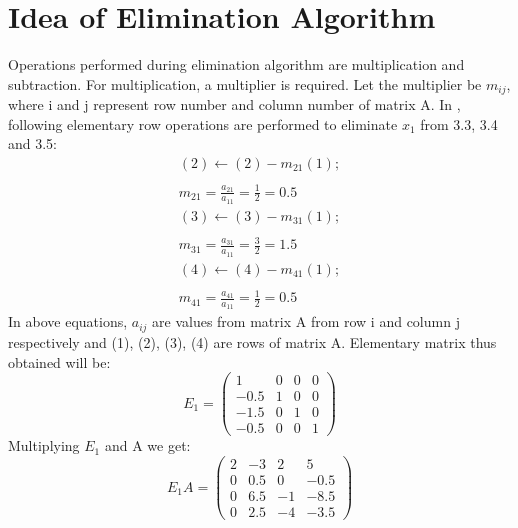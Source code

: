 \documentclass[12pt, oneside,table]{report}
\newcommand{\?}{\stackrel{?}{=}}
\theoremstyle{definition}
\begin{document}
\section{Idea of Elimination Algorithm}
Operations performed during elimination algorithm are multiplication and subtraction. For multiplication, a multiplier is required. Let the multiplier be $m_{ij}$, where i and j represent row number and column number of matrix A. In , following elementary row operations are performed to eliminate $x_{1}$ from 3.3, 3.4 and 3.5:
\begin{equation}
\begin{matrix}
    \left(2\right) \longleftarrow \left(2\right) - m_{21}\left(1\right);\\
    \\
    m_{21} = \frac{a_{21}}{a_{11}}=\frac{1}{2}=0.5
    \end{matrix}
\end{equation}
\begin{equation}
\begin{matrix}
    \left(3\right) \longleftarrow \left(3\right) - m_{31}\left(1\right);\\
    \\
    m_{31} = \frac{a_{31}}{a_{11}}=\frac{3}{2}=1.5
    \end{matrix}
\end{equation}
\begin{equation}
\begin{matrix}
    \left(4\right) \longleftarrow \left(4\right) - m_{41}\left(1\right);\\
    \\
    m_{41} = \frac{a_{41}}{a_{11}}=\frac{1}{2}=0.5
    \end{matrix}
\end{equation}
In above equations, $a_{ij}$ are values from matrix A from row i and column j respectively and (1), (2), (3), (4) are rows of matrix A.
Elementary matrix thus obtained will be:
\begin{equation}
    E_{1}=\begin{pmatrix}
    1&0&0&0\\
    -0.5&1&0&0\\
    -1.5&0&1&0\\
    -0.5&0&0&1
    \end{pmatrix}
\end{equation}
Multiplying $E_{1}$ and A we get:
\begin{equation}
    E_{1}A=\begin{pmatrix}
    2&-3&2&5\\
    0&0.5&0&-0.5\\
    0&6.5&-1&-8.5\\
    0&2.5&-4&-3.5
    \end{pmatrix}
\end{equation}
\end{document}
